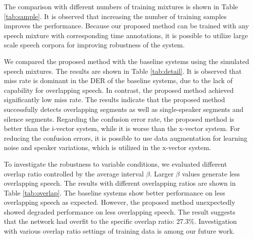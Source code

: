 \documentclass[a4paper]{article}
\begin{document}
The comparison with different numbers of training mixtures is shown in Table \ref{tab:sample}.
It is observed that increasing the number of training samples improves the performance.
Because our proposed method can be trained with any speech mixture with corresponding time annotations, it is possible to utilize large scale speech corpora for improving robustness of the system.

We compared the proposed method with the baseline systems using the simulated speech mixtures.
The results are shown in Table \ref{tab:detail}.
It is observed that miss rate is dominant in the DER of the baseline systems, due to the lack of capability for overlapping speech.
In contrast, the proposed method achieved significantly low miss rate.
The results indicate that the proposed method successfully detects overlapping segments as well as single-speaker segments and silence segments. 
Regarding the confusion error rate, the proposed method is better than the i-vector system, while it is worse than the x-vector system.
For reducing the confusion errors, it is possible to use data augmentation for learning noise and speaker variations, which is utilized in the x-vector system.

To investigate the robustness to variable conditions, we evaluated different overlap ratio controlled by the average interval $\beta$. Larger $\beta$ values generate less overlapping speech.
The results with different overlapping ratios are shown in Table \ref{tab:overlap}.
The baseline systems show better performance on less overlapping speech as expected.
However, the proposed method unexpectedly showed degraded performance on less overlapping speech.
The result suggests that the network had overfit to the specific overlap ratio: 27.3\%.
Investigation with various overlap ratio settings of training data is among our future work.
\end{document}
